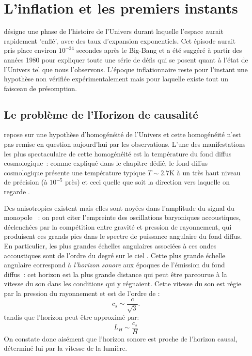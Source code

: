 \chapter{L'inflation et les premiers instants}
 désigne une phase de l'histoire de l'Univers durant laquelle l'espace aurait rapidement 'enflé', avec des taux d'expansion exponentiels. Cet épisode aurait pris place environ $10^{-34}$ secondes après le Big-Bang et a été suggéré à partir des années 1980 pour expliquer toute une série de défis qui se posent quant à l'état de l'Univers tel que nous l'observons. L'époque inflationnaire reste pour l'instant une hypothèse non vérifiée expérimentalement mais pour laquelle existe tout un faisceau de présomption.

\section{Le problème de l'Horizon de causalité}
 repose sur une hypothèse d'homogénéité de l'Univers et cette homogénéité n'est pas remise en question aujourd'hui par les observations. L'une des manifestations les plus spectaculaire de cette homogénéité est la température du fond diffus cosmologique~: comme expliqué dans le chapitre dédié, le fond diffus cosmologique présente une température typique $T\sim 2.7 $K à un très haut niveau de précision (à $10^{-5}$ près) et ceci quelle que soit la direction vers laquelle on regarde . 

Des anisotropies existent mais elles sont noyées dans l'amplitude du signal du monopole~ : on peut citer l'empreinte des oscillations baryoniques accoustiques, déclenchées par la compétition entre gravité et pression de rayonnement, qui produisent ces grands pics dans le spectre de puissance angulaire du fond diffus. En particulier, les plus grandes échelles angulaires associées à ces ondes accoustiques sont de l'ordre du degré sur le ciel . Cette plus grande échelle angulaire correspond à \textit{l'horizon sonore} aux époques de l'émission du fond diffus~: cet horizon est la plus grande distance qui peut être parcourue à la vitesse du son dans les conditions qui y régnaient. Cette vitesse du son est régie par la pression du rayonnement et est de l'ordre de :
\begin{equation}
c_s\sim \frac{c}{\sqrt 3}.
\end{equation}
tandis que l'horizon peut-être approximé par:
\begin{equation}
L_H\sim\frac{c_s}{H}
\end{equation}
On constate donc aisément que l'horizon sonore est proche de l'horizon causal, déterminé lui par la vitesse de la lumière.


